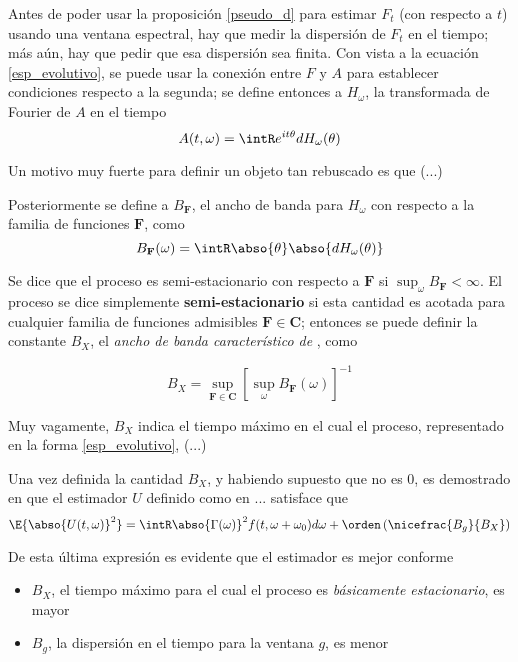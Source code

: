 Antes de poder usar la proposición \ref{pseudo_d} para estimar $F_t$ (con respecto a $t$) usando 
una ventana espectral, hay que medir la dispersión de $F_t$ en el tiempo; más aún, hay que pedir 
que esa dispersión sea finita.
Con vista a la ecuación \ref{esp_evolutivo}, se puede usar la conexión entre $F$ y $A$ para 
establecer condiciones respecto a la segunda; se define entonces a $H_\omega$, la transformada de
Fourier de $A$ en el tiempo
\begin{equation}
A(t,\omega) = \intR e^{i t \theta} dH_\omega(\theta)
\end{equation}

Un motivo muy fuerte para definir un objeto tan rebuscado es que (...)

Posteriormente se define a $B_{\mathbf{F}}$, el ancho de banda para $H_\omega$ con respecto a la 
familia de funciones $\mathbf{F}$, como
%
\begin{equation}
B_{\mathbf{F}}(\omega) = \intR \abso{\theta} \abso{dH_\omega(\theta)}
\end{equation}

Se dice que el proceso es semi-estacionario con respecto a $\mathbf{F}$ si 
$\sup_\omega B_{\mathbf{F}} < \infty$. El proceso se dice simplemente \textbf{semi-estacionario} 
si esta cantidad es acotada para cualquier familia de funciones admisibles 
$\mathbf{F} \in \mathbf{C}$; entonces se puede definir la constante $B_X$, el \textit{ancho de 
banda característico de} \xt, como

\begin{equation}
B_X = \sup_{\mathbf{F}\in \mathbf{C}} \left[ \sup_\omega B_{\mathbf{F}}(\omega) \right]^{-1}
\end{equation}

Muy vagamente, $B_X$ indica el tiempo máximo en el cual el proceso, representado en la forma
\ref{esp_evolutivo}, (...)

Una vez definida la cantidad $B_X$, y habiendo supuesto que no es 0, es demostrado en 
\cite{Priestley65} que el estimador $U$ definido como en ... satisface que
%
\begin{equation}
\E{\abso{U(t,\omega)}^{2}} = \intR \abso{\Gamma(\omega)}^{2} f(t,\omega+\omega_0) d\omega
+ \orden\left( \nicefrac{B_g}{B_X} \right)
\end{equation}

De esta última expresión es evidente que el estimador es mejor conforme 
\begin{itemize}
\item  $B_X$, el tiempo máximo para el cual el proceso es \textit{básicamente estacionario}, es 
mayor
\item $B_g$, la dispersión en el tiempo para la ventana $g$, es menor
\end{itemize}

